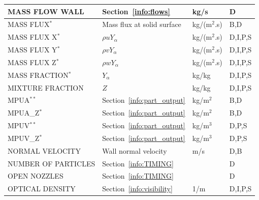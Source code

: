 \documentclass[11pt]{book}
\begin{document}
\begin{longtable}{@{\extracolsep{\fill}}|l|l|l|l|}
{\ct MASS FLOW WALL}                            & Section~\ref{info:flows}                      & kg/s           & D            \\ \hline
{\ct MASS FLUX}$^*$                             & Mass flux at solid surface                    & \si{kg/(m$^2$.s)} & B,D       \\ \hline
{\ct MASS FLUX X}$^*$                           & $\rho u Y_\alpha$                             & \si{kg/(m$^2$.s)} & D,I,P,S   \\ \hline
{\ct MASS FLUX Y}$^*$                           & $\rho v Y_\alpha$                             & \si{kg/(m$^2$.s)} & D,I,P,S   \\ \hline
{\ct MASS FLUX Z}$^*$                           & $\rho w Y_\alpha$                             & \si{kg/(m$^2$.s)} & D,I,P,S   \\ \hline
{\ct MASS FRACTION}$^*$                         & $Y_\alpha$                                    & kg/kg          & D,I,P,S      \\ \hline
{\ct MIXTURE FRACTION}                          & $Z$                                           & kg/kg          & D,I,P,S      \\ \hline
{\ct MPUA}$^{**}$                               & Section~\ref{info:part_output}                & kg/m$^2$       & B,D          \\ \hline
{\ct MPUA\_Z}$^{*}$                             & Section~\ref{info:part_output}                & kg/m$^2$       & B,D          \\ \hline
{\ct MPUV}$^{**}$                               & Section~\ref{info:part_output}                & kg/m$^3$       & D,P,S        \\ \hline
{\ct MPUV\_Z}$^{*}$                             & Section~\ref{info:part_output}                & kg/m$^3$       & D,P,S        \\ \hline
{\ct NORMAL VELOCITY}                           & Wall normal velocity                          & m/s            & D,B          \\ \hline
{\ct NUMBER OF PARTICLES}                       & Section~\ref{info:TIMING}                     &                & D            \\ \hline
{\ct OPEN NOZZLES}                              & Section~\ref{info:TIMING}                     &                & D            \\ \hline
{\ct OPTICAL DENSITY}                           & Section~\ref{info:visibility}                 & 1/m            & D,I,P,S      \\ \hline

\end{longtable}
\end{document}
